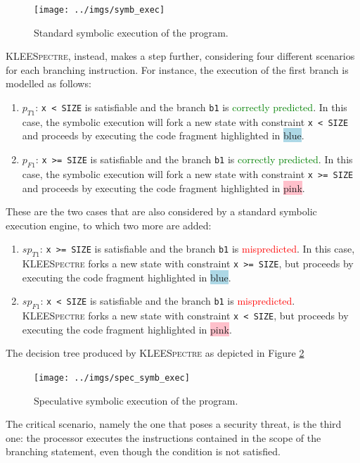 \documentclass[12pt,a4paper]{book}
\theoremstyle{definition}
\begin{document}
	\begin{figure}[!h]
		\centering
		\texttt{[image: ../imgs/symb\_exec]}
		\caption{Standard symbolic execution of the program.}
		\label{fig:standars_symb_exec}
	\end{figure}
	\textsc{KLEESpectre}, instead, makes a step further, considering four different scenarios for each branching instruction. For instance, the execution of the first branch is modelled as follows: 
	\begin{enumerate}
		\item $p_{T1}$: \texttt{x < SIZE} is satisfiable and the branch \texttt{b1} is \textcolor{green}{correctly predicted}. In this case, the symbolic execution will fork a new state with constraint \texttt{x < SIZE} and proceeds by executing the code fragment highlighted in \colorbox{lightblue}{blue}.
		\item $p_{F1}$: \texttt{x >= SIZE} is satisfiable and the branch \texttt{b1} is \textcolor{green}{correctly predicted}. In this case, the symbolic execution will fork a new state with constraint \texttt{x >= SIZE} and proceeds by executing the code fragment highlighted in \colorbox{pink}{pink}.
	\end{enumerate}
	These are the two cases that are also considered by a standard symbolic execution engine, to which two more are added:
	\begin{enumerate}[resume]
		\item $sp_{T1}$: \texttt{x >= SIZE} is satisfiable and the branch \texttt{b1} is \textcolor{red}{mispredicted}. In this case, \textsc{KLEESpectre} forks a new state with constraint \texttt{x >= SIZE}, but proceeds by executing the code fragment highlighted in \colorbox{lightblue}{blue}.
		\item $sp_{F1}$: \texttt{x < SIZE} is satisfiable and the branch \texttt{b1} is \textcolor{red}{mispredicted}. \textsc{KLEESpectre} forks a new state with constraint \texttt{x < SIZE}, but proceeds by executing the code fragment highlighted in \colorbox{pink}{pink}.
	\end{enumerate}
	The decision tree produced by \textsc{KLEESpectre} as depicted in Figure \ref{fig:spec_symb_exec}
	
	\begin{figure}[!h]
		\centering
		\texttt{[image: ../imgs/spec\_symb\_exec]}
		\caption{Speculative symbolic execution of the program.}
		\label{fig:spec_symb_exec}
	\end{figure}
	
	The critical scenario, namely the one that poses a security threat, is the third one: the processor executes the instructions contained in the scope of the branching statement, even though the condition is not satisfied. 
	
\end{document}
